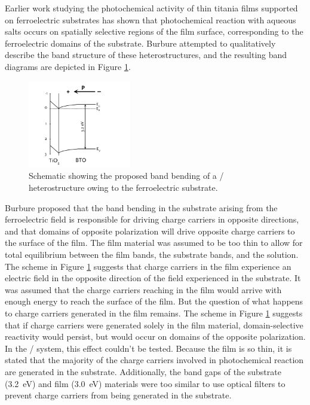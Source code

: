 Earlier work studying the photochemical activity of thin titania films supported on ferroelectric substrates has shown that photochemical reaction with aqueous salts occurs on spatially selective regions of the film surface, corresponding to the ferroelectric domains of the substrate.\cite{Burbure:2010go,Burbure:2006cq,Burbure:2010ti} Burbure \cite{Burbure:2010go} attempted to qualitatively describe the band structure of these heterostructures, and the resulting band diagrams are depicted in Figure \ref{fig:ninabending}. 
\begin{figure}[htbp]
\begin{center}
\includegraphics[width=0.4\textwidth]{ninabending.pdf}
\caption[Proposed band bending of a / heterostructure]{Schematic showing the proposed band bending of a / heterostructure owing to the ferroelectric  substrate.\cite{Burbure:2010go}}
\label{fig:ninabending} %
\end{center}
\end{figure}
Burbure proposed that the band bending in the substrate arising from the ferroelectric field is responsible for driving charge carriers in opposite directions, and that domains of opposite polarization will drive opposite charge carriers to the surface of the film. The film material was assumed to be too thin to allow for total equilibrium between the film bands, the substrate bands, and the solution. The scheme in Figure \ref{fig:ninabending} suggests that charge carriers in the film experience an electric field in the opposite direction of the field experienced in the substrate. It was assumed that the charge carriers reaching in the film would arrive with enough energy to reach the surface of the film. But the question of what happens to charge carriers generated in the film remains. The scheme in Figure \ref{fig:ninabending} suggests that if charge carriers were generated solely in the film material, domain-selective reactivity would persist, but would occur on domains of the opposite polarization. In the / system, this effect couldn't be tested. Because the film is so thin, it is stated that the majority of the charge carriers involved in photochemical reaction are generated in the substrate. Additionally, the band gaps of the substrate (\texttildelow\SI{3.2}{\electronvolt}) and film (\texttildelow\SI{3.0}{\electronvolt}) materials were too similar to use optical filters to prevent charge carriers from being generated in the substrate. 

